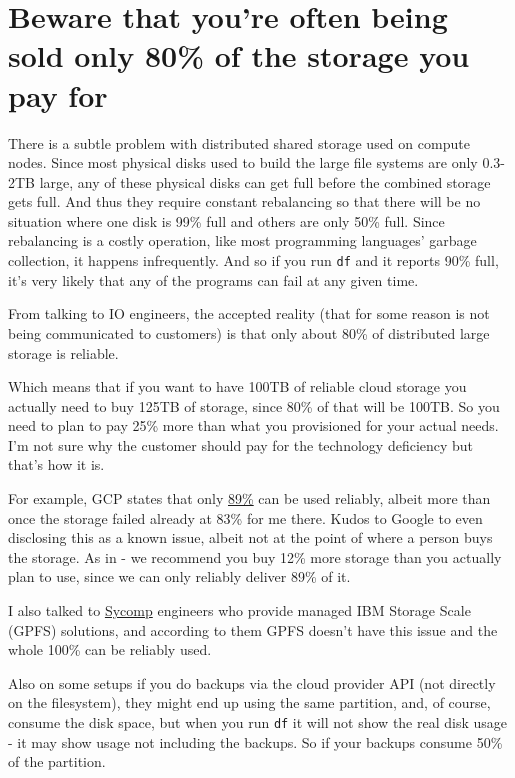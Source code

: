 \documentclass[
]{report}
\begin{document}
\section{Beware that you're often being sold only 80\% of the storage
you pay
for}\label{beware-that-youre-often-being-sold-only-80-of-the-storage-you-pay-for}

There is a subtle problem with distributed shared storage used on
compute nodes. Since most physical disks used to build the large file
systems are only 0.3-2TB large, any of these physical disks can get full
before the combined storage gets full. And thus they require constant
rebalancing so that there will be no situation where one disk is 99\%
full and others are only 50\% full. Since rebalancing is a costly
operation, like most programming languages' garbage collection, it
happens infrequently. And so if you run \texttt{df} and it reports 90\%
full, it's very likely that any of the programs can fail at any given
time.

From talking to IO engineers, the accepted reality (that for some reason
is not being communicated to customers) is that only about 80\% of
distributed large storage is reliable.

Which means that if you want to have 100TB of reliable cloud storage you
actually need to buy 125TB of storage, since 80\% of that will be 100TB.
So you need to plan to pay 25\% more than what you provisioned for your
actual needs. I'm not sure why the customer should pay for the
technology deficiency but that's how it is.

For example, GCP states that only
\href{https://cloud.google.com/filestore/docs/known-issues\#capacity_errors_before_reaching_full_provisioned_capacity}{89\%}
can be used reliably, albeit more than once the storage failed already
at 83\% for me there. Kudos to Google to even disclosing this as a known
issue, albeit not at the point of where a person buys the storage. As in
- we recommend you buy 12\% more storage than you actually plan to use,
since we can only reliably deliver 89\% of it.

I also talked to \href{https://sycomp.com/}{Sycomp} engineers who
provide managed IBM Storage Scale (GPFS) solutions, and according to
them GPFS doesn't have this issue and the whole 100\% can be reliably
used.

Also on some setups if you do backups via the cloud provider API (not
directly on the filesystem), they might end up using the same partition,
and, of course, consume the disk space, but when you run \texttt{df} it
will not show the real disk usage - it may show usage not including the
backups. So if your backups consume 50\% of the partition.
\end{document}
